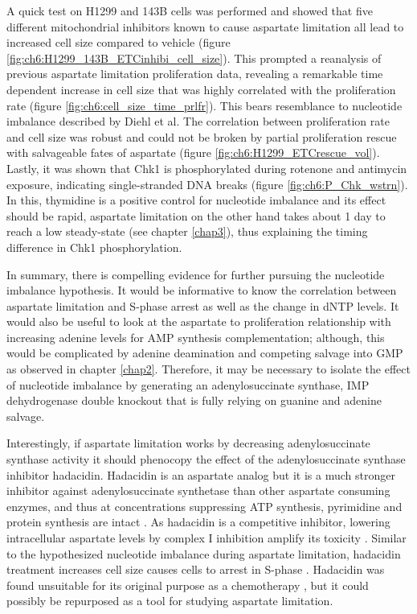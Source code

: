 A quick test on H1299 and 143B cells was performed and showed that five different mitochondrial inhibitors known to cause aspartate limitation all lead to increased cell size compared to vehicle (figure \ref{fig:ch6:H1299_143B_ETCinhibi_cell_size}).
This prompted a reanalysis of previous aspartate limitation proliferation data, revealing a remarkable time dependent increase in cell size that was highly correlated with the proliferation rate (figure \ref{fig:ch6:cell_size_time_prlfr}).
This bears resemblance to nucleotide imbalance described by Diehl et al.
The correlation between proliferation rate and cell size was robust and could not be broken by partial proliferation rescue with salvageable fates of aspartate (figure \ref{fig:ch6:H1299_ETCrescue_vol}).
Lastly, it was shown that Chk1 is phosphorylated during rotenone and antimycin exposure, indicating single-stranded DNA breaks (figure \ref{fig:ch6:P_Chk_wstrn}).
In this, thymidine is a positive control for nucleotide imbalance and its effect should be rapid, aspartate limitation on the other hand takes about 1 day to reach a low steady-state (see chapter \ref{chap3}), thus explaining the timing difference in Chk1 phosphorylation.

In summary, there is compelling evidence for further pursuing the nucleotide imbalance hypothesis.
It would be informative to know the correlation between aspartate limitation and S-phase arrest as well as the change in dNTP levels.
It would also be useful to look at the aspartate to proliferation relationship with increasing adenine levels for AMP synthesis complementation; although, this would be complicated by adenine deamination and competing salvage into GMP as observed in chapter \ref{chap2}.
Therefore, it may be necessary to isolate the effect of nucleotide imbalance by generating an adenylosuccinate synthase, IMP dehydrogenase double knockout that is fully relying on guanine and adenine salvage.

Interestingly, if aspartate limitation works by decreasing adenylosuccinate synthase activity it should phenocopy the effect of the adenylosuccinate synthase inhibitor hadacidin.
Hadacidin is an aspartate analog but it is a much stronger inhibitor against adenylosuccinate synthetase than other aspartate consuming enzymes, and thus at concentrations suppressing ATP synthesis, pyrimidine and protein synthesis are intact \cite{Shigeura1962-nu, Shigeura1962-ot}.
As hadacidin is a competitive inhibitor, lowering intracellular aspartate levels by complex I inhibition amplify its toxicity \cite{Neuman1963-dx}.
Similar to the hypothesized nucleotide imbalance during aspartate limitation, hadacidin treatment increases cell size causes cells to arrest in S-phase \cite{Ladino1989-rj}.
Hadacidin was found unsuitable for its original purpose as a chemotherapy \cite{national1968cancer}, but it could possibly be repurposed as a tool for studying aspartate limitation.

